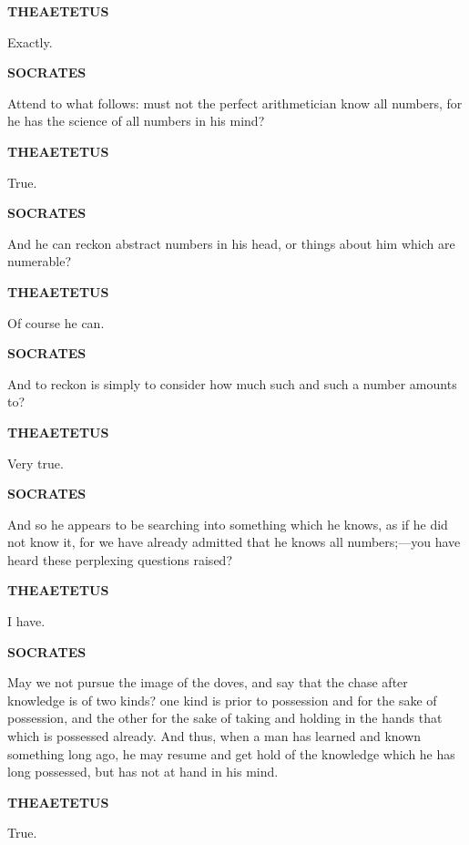 \documentclass[11pt,letter]{article}
\begin{document}
\par \textbf{THEAETETUS}
\par   Exactly.

\par \textbf{SOCRATES}
\par   Attend to what follows:  must not the perfect arithmetician know all numbers, for he has the science of all numbers in his mind?

\par \textbf{THEAETETUS}
\par   True.

\par \textbf{SOCRATES}
\par   And he can reckon abstract numbers in his head, or things about him which are numerable?

\par \textbf{THEAETETUS}
\par   Of course he can.

\par \textbf{SOCRATES}
\par   And to reckon is simply to consider how much such and such a number amounts to?

\par \textbf{THEAETETUS}
\par   Very true.

\par \textbf{SOCRATES}
\par   And so he appears to be searching into something which he knows, as if he did not know it, for we have already admitted that he knows all numbers;—you have heard these perplexing questions raised?

\par \textbf{THEAETETUS}
\par   I have.

\par \textbf{SOCRATES}
\par   May we not pursue the image of the doves, and say that the chase after knowledge is of two kinds? one kind is prior to possession and for the sake of possession, and the other for the sake of taking and holding in the hands that which is possessed already. And thus, when a man has learned and known something long ago, he may resume and get hold of the knowledge which he has long possessed, but has not at hand in his mind.

\par \textbf{THEAETETUS}
\par   True.
\end{document}
